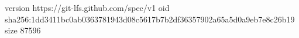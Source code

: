 version https://git-lfs.github.com/spec/v1
oid sha256:1dd3411bc0ab0363781943d08c5617b7b2df36357902a65a5d0a9eb7e8c26b19
size 87596
